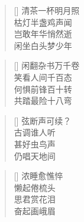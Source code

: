 \renewcommand{\poemtoc}{section}
\settowidth{\versewidth}{四年偏安南隅中}
\begin{verse}[\versewidth]
清茶一杯明月照\\
枯灯半盏鸡声闻\\
岂敢年华悄然逝\\
闲坐白头梦少年\\
\end{verse}

\renewcommand{\poemtoc}{section}
\settowidth{\versewidth}{四年偏安南隅中}
\begin{verse}[\versewidth]
闲翻杂书万千卷\\
笑看人间千百态\\
何惧前锋百十转\\
共踏最险十八弯\\
\end{verse}


\renewcommand{\poemtoc}{section}
\settowidth{\versewidth}{弦断声可续}
\begin{verse}[\versewidth]
弦断声可续？\\
古调谁人听\\
甚好虫鸟声\\
仍唱天地间
\end{verse}

\renewcommand{\poemtoc}{section}
\settowidth{\versewidth}{浓睡愈憔悴}
\begin{verse}[\versewidth]
浓睡愈憔悴\\
懒起倦梳头\\
思君赏花泪\\
奋起画峨眉
\end{verse}
